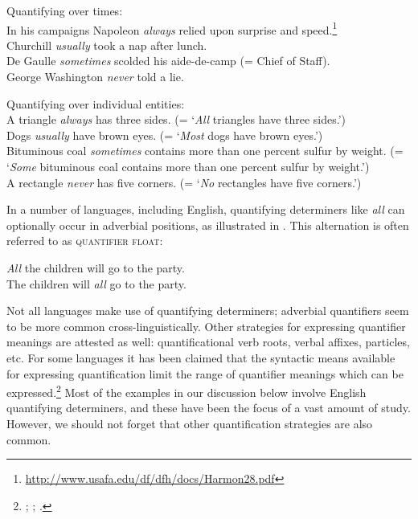 \ea \label{ex:14.7}
Quantifying over times:\\
\ea In his campaigns Napoleon \textit{always} relied upon surprise and speed.\footnote{\url{http://www.usafa.edu/df/dfh/docs/Harmon28.pdf}} \\
\ex Churchill \textit{usually} took a nap after lunch.\\
\ex De Gaulle \textit{sometimes} scolded his aide-de-camp (= Chief of Staff).\\
\ex George Washington \textit{never} told a lie.
                       \z
\z

\ea \label{ex:14.8}
Quantifying over individual entities:\\
\ea A triangle \textit{always} has three sides. (= ‘\textit{All} triangles have three sides.’)\\
\ex Dogs \textit{usually} have brown eyes. (= ‘\textit{Most} dogs have brown eyes.’)\\
\ex Bituminous coal \textit{sometimes} contains more than one percent sulfur by weight. (= ‘\textit{Some} bituminous coal contains more than one percent sulfur by weight.’)\\
\ex A rectangle \textit{never} has five corners. (= ‘\textit{No} rectangles have five corners.’)
                       \z
\z


In a number of languages, including English, quantifying determiners like \textit{all} can optionally occur in adverbial positions, as illustrated in . This alternation is often referred to as \textsc{quantifier float}:

\newpage 

\ea \label{ex:14.9}
\ea \textit{All} the children will go to the party.\\
\ex The children will \textit{all} go to the party.
                       \z
\z


Not all languages make use of quantifying determiners; adverbial quantifiers seem to be more common cross-linguistically. Other strategies for expressing quantifier meanings are attested as well: quantificational verb roots, verbal affixes, particles, etc. For some languages it has been claimed that the syntactic means available for expressing quantification limit the range of quantifier meanings which can be expressed.\footnote{\citet{Baker1995}; \citet{Bittner1995}; \citet{KoenigMichelson2010}.} Most of the examples in our discussion below involve English quantifying determiners, and these have been the focus of a vast amount of study. However, we should not forget that other quantification strategies are also common.



